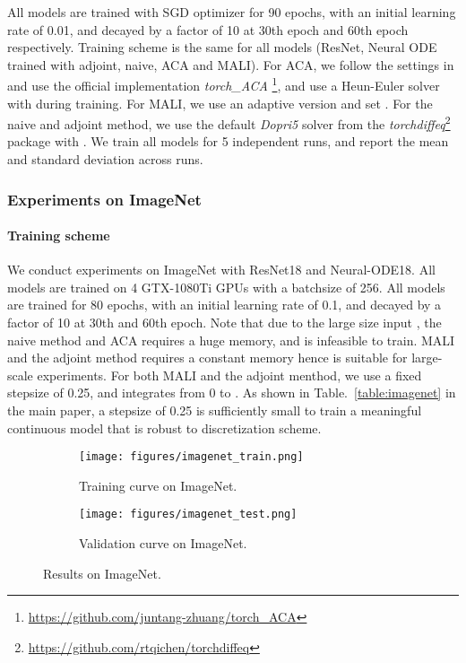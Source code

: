 \documentclass{article} \usepackage{iclr2021_conference,times}
\begin{document}
All models are trained with SGD optimizer for 90 epochs, with an initial learning rate of 0.01, and decayed by a factor of 10 at 30th epoch and 60th epoch respectively. Training scheme is the same for all models (ResNet, Neural ODE trained with adjoint, naive, ACA and MALI). For ACA, we follow the settings in \citep{zhuang2020adaptive} and use the official implementation \textit{torch\_ACA} \footnote{\url{https://github.com/juntang-zhuang/torch_ACA}}, 
and use a Heun-Euler solver with  during training. For MALI, we use an adaptive version and set . For the naive and adjoint method, we use the default \textit{Dopri5} solver from the \textit{torchdiffeq}\footnote{\url{https://github.com/rtqichen/torchdiffeq}} package with . We train all models for 5 independent runs, and report the mean and standard deviation across runs. 

\subsubsection{Experiments on ImageNet}
\paragraph{Training scheme}
We conduct experiments on ImageNet with ResNet18 and Neural-ODE18. All models are trained on 4 GTX-1080Ti GPUs with a batchsize of 256. All models are trained for 80 epochs, with an initial learning rate of 0.1, and decayed by a factor of 10 at 30th and 60th epoch. Note that due to the large size input , the naive method and ACA requires a huge memory, and is infeasible to train. MALI and the adjoint method requires a constant memory hence is suitable for large-scale experiments. For both MALI and the adjoint menthod, we use a fixed stepsize of 0.25, and integrates from 0 to . As shown in Table.~\ref{table:imagenet} in the main paper, a stepsize of 0.25 is sufficiently small to train a meaningful continuous model that is robust to discretization scheme. 

\begin{figure}
\begin{subfigure}{0.5\textwidth}
\texttt{[image: figures/imagenet\_train.png]}
\caption{Training curve on ImageNet.}
\end{subfigure}
\begin{subfigure}{0.5\textwidth}
\texttt{[image: figures/imagenet\_test.png]}
\caption{Validation curve on ImageNet.}
\end{subfigure}
\caption{Results on ImageNet.}
\end{figure}
\end{document}
